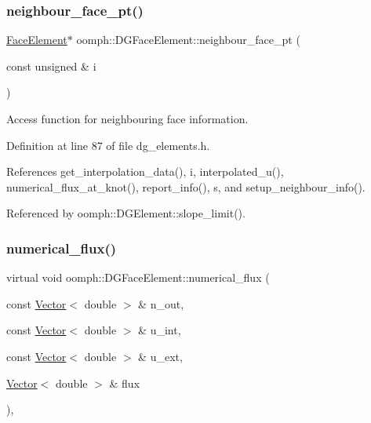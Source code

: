 \subsubsection{\texorpdfstring{neighbour\+\_\+face\+\_\+pt()}{neighbour\_face\_pt()}}
{\footnotesize\ttfamily \hyperlink{classoomph_1_1FaceElement}{Face\+Element}$\ast$ oomph\+::\+D\+G\+Face\+Element\+::neighbour\+\_\+face\+\_\+pt (\begin{DoxyParamCaption}\item[{const unsigned \&}]{i }\end{DoxyParamCaption})\hspace{0.3cm}{\ttfamily [inline]}}



Access function for neighbouring face information. 



Definition at line 87 of file dg\+\_\+elements.\+h.



References get\+\_\+interpolation\+\_\+data(), i, interpolated\+\_\+u(), numerical\+\_\+flux\+\_\+at\+\_\+knot(), report\+\_\+info(), s, and setup\+\_\+neighbour\+\_\+info().



Referenced by oomph\+::\+D\+G\+Element\+::slope\+\_\+limit().

\mbox{\label{classoomph_1_1DGFaceElement_a023e05bcee73952fbc2c1f816a0a0860}} 
\subsubsection{\texorpdfstring{numerical\+\_\+flux()}{numerical\_flux()}}
{\footnotesize\ttfamily virtual void oomph\+::\+D\+G\+Face\+Element\+::numerical\+\_\+flux (\begin{DoxyParamCaption}\item[{const \hyperlink{classoomph_1_1Vector}{Vector}$<$ double $>$ \&}]{n\+\_\+out,  }\item[{const \hyperlink{classoomph_1_1Vector}{Vector}$<$ double $>$ \&}]{u\+\_\+int,  }\item[{const \hyperlink{classoomph_1_1Vector}{Vector}$<$ double $>$ \&}]{u\+\_\+ext,  }\item[{\hyperlink{classoomph_1_1Vector}{Vector}$<$ double $>$ \&}]{flux }\end{DoxyParamCaption})\hspace{0.3cm}{\ttfamily [inline]}, {\ttfamily [virtual]}}



